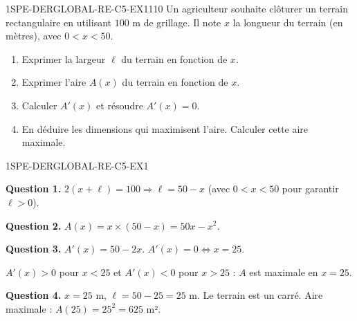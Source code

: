 

\begin{exercice}{1SPE-DERGLOBAL-RE-C5-EX1}{1}{10}
Un agriculteur souhaite clôturer un terrain rectangulaire en utilisant $100$ m de grillage. Il note $x$ la longueur du terrain (en mètres), avec $0 < x < 50$.
\begin{enumerate}
  \item Exprimer la largeur $\ell$ du terrain en fonction de $x$.
  \item Exprimer l'aire $A(x)$ du terrain en fonction de $x$.
  \item Calculer $A'(x)$ et résoudre $A'(x) = 0$.
  \item En déduire les dimensions qui maximisent l'aire. Calculer cette aire maximale.
\end{enumerate}
\end{exercice}



\begin{corrige}{1SPE-DERGLOBAL-RE-C5-EX1}


\textbf{Question 1.}
$2(x + \ell) = 100 \Rightarrow \ell = 50 - x$ (avec $0 < x < 50$ pour garantir $\ell > 0$).

\textbf{Question 2.}
$A(x) = x \times (50 - x) = 50x - x^2.$

\textbf{Question 3.}
$A'(x) = 50 - 2x.$ $A'(x) = 0 \Leftrightarrow x = 25.$

$A'(x) > 0$ pour $x < 25$ et $A'(x) < 0$ pour $x > 25$ : $A$ est maximale en $x = 25$.

\textbf{Question 4.}
$x = 25$ m, $\ell = 50 - 25 = 25$ m. Le terrain est un carré. Aire maximale : $A(25) = 25^2 = 625$ m².

\end{corrige}

